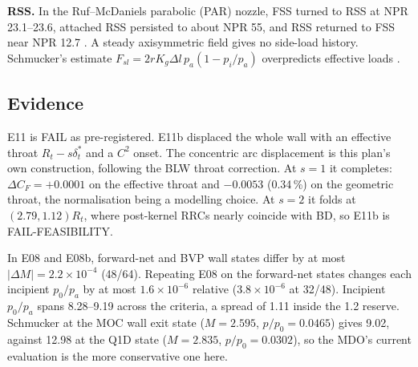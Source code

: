 \textbf{RSS.} In the Ruf--McDaniels parabolic (PAR) nozzle, FSS turned to RSS at NPR
23.1--23.6, attached RSS persisted to about NPR 55, and RSS returned to FSS near NPR 12.7
\cite[PDF pp.~19--21]{ruf2010}. A steady axisymmetric field gives no side-load history. Schmucker's estimate $F_{sl}=2rK_g\Delta l\,p_a(1-p_i/p_a)$ overpredicts
effective loads \cite[PDF pp.~46--47, printed pp.~38--39, Eqs.~21--22]{schmucker1984b}.

\subsection{Evidence}
E11 is FAIL as pre-registered. E11b displaced the whole wall with an effective throat
$R_t-s\delta^*_t$ and a $C^2$ onset. The concentric arc displacement is this plan's own
construction, following the BLW throat correction. At $s=1$ it completes:
$\Delta C_F=+0.0001$ on the effective throat and $-0.0053$ (0.34\,\%) on the geometric
throat, the normalisation being a modelling choice. At $s=2$ it folds at
$(2.79,1.12)R_t$, where post-kernel RRCs nearly coincide with BD, so E11b is
FAIL-FEASIBILITY.

In E08 and E08b, forward-net and BVP wall states differ by at most
$|\Delta M|=2.2\times10^{-4}$ (48/64). Repeating E08 on the forward-net states changes
each incipient $p_0/p_a$ by at most $1.6\times10^{-6}$ relative ($3.8\times10^{-6}$ at
32/48). Incipient $p_0/p_a$ spans 8.28--9.19 across the criteria, a spread of 1.11
inside the 1.2 reserve. Schmucker at the MOC wall exit state ($M=2.595$,
$p/p_0=0.0465$) gives 9.02, against 12.98 at the Q1D state ($M=2.835$, $p/p_0=0.0302$),
so the MDO's current evaluation is the more conservative one here.


